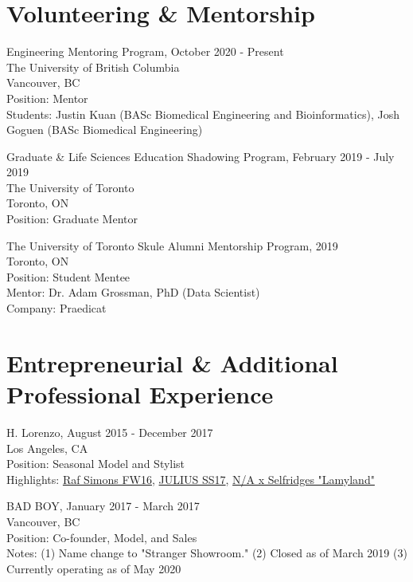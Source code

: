 \documentclass[letterpaper]{article}
\renewenvironment{itemize}{
  \begin{list}{}{
    \setlength{\leftmargin}{1.5em}
  }
}{
  \end{list}
}
\begin{document}
\section*{\textbf{Volunteering \& Mentorship}}
\begin{itemize}
    \item Engineering Mentoring Program, October 2020 - Present
    \\ The University of British Columbia
    \\ Vancouver, BC
    \\ Position: Mentor
    \\ Students: Justin Kuan (BASc Biomedical Engineering and Bioinformatics), Josh Goguen (BASc Biomedical Engineering)
    \item Graduate \& Life Sciences Education Shadowing Program, February 2019 - July 2019
    \\The University of Toronto
    \\Toronto, ON
    \\Position: Graduate Mentor 
    \item The University of Toronto Skule Alumni Mentorship Program, 2019
    \\Toronto, ON
    \\Position: Student Mentee
    \\Mentor: Dr. Adam Grossman, PhD (Data Scientist)
    \\Company: Praedicat 
\end{itemize}

\section*{\textbf{Entrepreneurial \& Additional Professional Experience}}

\begin{itemize}
\item H. Lorenzo, August 2015 - December 2017
\\Los Angeles, CA
\\Position: Seasonal Model and Stylist
\\Highlights: \href{https://www.highsnobiety.com/2016/09/10/raf-simons-fw16-collection-h-lorenzo-editorial/}{Raf Simons FW16}, \href{https://hypebeast.com/2017/12/julius-spring-summer-2018-collection-h-lorenzo-pop-up}{JULIUS SS17}, \href{https://hypebeast.com/2018/1/not-applicable-selfridges-michele-lamy}{N/A x Selfridges "Lamyland"}
\item BAD BOY, January 2017 - March 2017
\\Vancouver, BC
\\Position: Co-founder, Model, and Sales
\\{\tiny Notes: (1) Name change to "Stranger Showroom." (2) Closed as of March 2019 (3) Currently operating as of May 2020}
\end{itemize}
\end{document}
